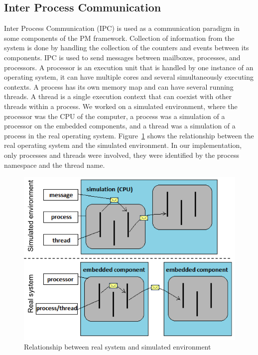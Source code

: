 \subsection{Inter Process Communication}\label{sec:IPC}
Inter Process Communication (IPC) is used as a communication paradigm in some components of the PM framework. Collection of information from the system is done by handling the collection of the counters and events between its components. %
 IPC is used to send messages between mailboxes, processes, and processors. A processor is an execution unit that is handled by one instance of an operating system, it can have multiple cores and several simultaneously executing contexts. A process has its own memory map and can have several running threads. A thread is a single execution context that can coexist with other threads within a process. We worked on a simulated environment, where the processor was the CPU of the computer, a process was a simulation of a processor on the embedded components,  and a thread was a simulation of a process in the real operating system. Figure~\ref{simulationVSembedded} shows the relationship between the real operating system and the simulated environment. In our implementation, only processes and threads were involved, they were identified by the process namespace and the thread name. %

\begin{figure}[h]
\centering
\includegraphics[width=\columnwidth]{figure/simulationVSembedded.png}
\caption{Relationship between real system and  simulated environment \label{simulationVSembedded}}
\end{figure}

